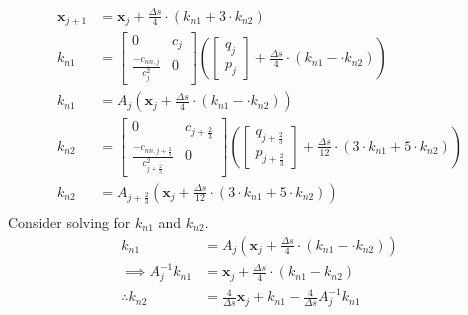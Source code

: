 \documentclass{article}
\begin{document}
\begin{align*}
	\bm{x}_{j+1} & = \bm{x}_j + \frac{\Delta s}{4}\cdot\left(k_{n1} + 3\cdot k_{n2}\right)                                                                                                                                                                                                               \\
	k_{n1}       & = \begin{bmatrix} 0 & c_j \\ \frac{-c_{nn, j}}{c^2_j} & 0\end{bmatrix}\left(\begin{bmatrix} q_j \\ p_j\end{bmatrix} + \frac{\Delta s}{4}\cdot(k_{n1} - \cdot k_{n2}) \right)                                                                                                          \\
	k_{n1}       & = A_j\left(\bm{x}_j + \frac{\Delta s}{4}\cdot(k_{n1} - \cdot k_{n2}) \right)                                                                                                                                                                                                          \\
	k_{n2}       & = \begin{bmatrix} 0 & c_{j + \frac{2}{3}} \\ \frac{-c_{nn, j + \frac{2}{3}}}{c^2_{j+\frac{2}{3}}} & 0\end{bmatrix}\left(\begin{bmatrix} q_{j+\frac{2}{3}} \\ p_{j+\frac{2}{3}}\end{bmatrix} + \frac{\Delta s}{12}\cdot(3\cdot k_{n1} + 5\cdot k_{n2}) \right) \\
	k_{n2}       & = A_{j+\frac{2}{3}}\left(\bm{x}_j + \frac{\Delta s}{12}\cdot(3\cdot k_{n1} + 5\cdot k_{n2}) \right)                                                                                                                                                                                   \\
\end{align*}
Consider solving for $k_{n1}$ and $k_{n2}$.
\begin{align*}
	k_{n1}                  & = A_j\left(\bm{x}_j + \frac{\Delta s}{4}\cdot(k_{n1} - \cdot k_{n2}) \right) \\
	\implies A_j^{-1}k_{n1} & = \bm{x}_j + \frac{\Delta s}{4}\cdot(k_{n1} - k_{n2})                        \\
	\therefore k_{n2}       & = \frac{4}{\Delta s}\bm{x}_j + k_{n1} - \frac{4}{\Delta s}A_j^{-1}k_{n1}
\end{align*}
\end{document}
